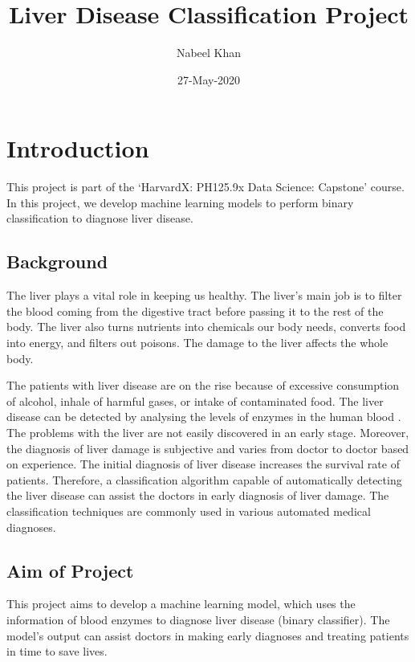 \documentclass[]{article}
\title{Liver Disease Classification Project}
\author{Nabeel Khan}
\date{27-May-2020}
\begin{document}
\maketitle

{
\setcounter{tocdepth}{2}
\tableofcontents
}
\section{Introduction}
\label{sec:introduction}

This project is part of the `HarvardX: PH125.9x Data Science: Capstone'
course. In this project, we develop machine learning models to perform
binary classification to diagnose liver disease.

\subsection{Background}
\label{sec:background}

The liver plays a vital role in keeping us healthy. The liver's main job
is to filter the blood coming from the digestive tract before passing it
to the rest of the body. The liver also turns nutrients into chemicals
our body needs, converts food into energy, and filters out poisons. The
damage to the liver affects the whole body.

The patients with liver disease are on the rise because of excessive
consumption of alcohol, inhale of harmful gases, or intake of
contaminated food. The liver disease can be detected by analysing the
levels of enzymes in the human blood \cite{ld,bendi}. The problems with
the liver are not easily discovered in an early stage. Moreover, the
diagnosis of liver damage is subjective and varies from doctor to doctor
based on experience. The initial diagnosis of liver disease increases
the survival rate of patients. Therefore, a classification algorithm
capable of automatically detecting the liver disease can assist the
doctors in early diagnosis of liver damage. The classification
techniques are commonly used in various automated medical diagnoses.

\subsection{Aim of Project}
\label{sec:aim}

This project aims to develop a machine learning model, which uses the
information of blood enzymes to diagnose liver disease (binary
classifier). The model's output can assist doctors in making early
diagnoses and treating patients in time to save lives.
\end{document}
